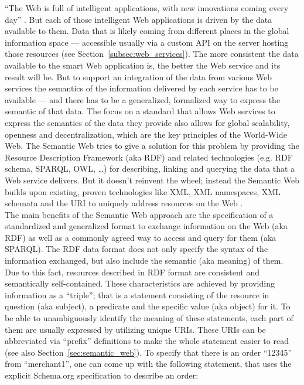 ``The Web is full of intelligent applications, with new innovations coming every day'' \citep{allemang2011semantic}. But each of those intelligent Web applications is driven by the data available to them. Data that is likely coming from different places in the global information space — accessible usually via a custom API on the server hosting those resources (see Section~\ref{subsec:web_services}). The more consistent the data available to the smart Web application is, the better the Web service and its result will be. But to support an integration of the data from various Web services the semantics of the information delivered by each service has to be available — and there has to be a generalized, formalized way to express the semantic of that data. The focus on a standard that allows Web services to express the semantics of the data they provide also allows for global scalability, openness and decentralization, which are the key principles of the World-Wide Web. The Semantic Web tries to give a solution for this problem by providing the Resource Description Framework (aka \gls{RDF}) and related technologies (e.g. RDF schema, \gls{SPARQL}, \gls{OWL}, \ldots) for describing, linking and querying the data that a Web service delivers. But it doesn’t reinvent the wheel; instead the Semantic Web builds upon existing, proven technologies like \gls{XML}, XML namespaces, XML schemata and the \gls{URI} to uniquely address resources on the Web \citep{allemang2011semantic}. \\

The main benefits of the Semantic Web approach are the specification of a standardized and generalized format to exchange information on the Web (aka \gls{RDF}) as well as a commonly agreed way to access and query for them (aka \gls{SPARQL}). The \gls{RDF} data format does not only specify the syntax of the information exchanged, but also include the semantic (aka meaning) of them. Due to this fact, resources described in \gls{RDF} format are consistent and semantically self-contained. These characteristics are achieved by providing information as a ``triple''; that is a statement consisting of the resource in question (aka subject), a predicate and the specific value (aka object) for it. To be able to unambiguously identify the meaning of these statements, each part of them are usually expressed by utilizing unique \gls{URI}s. These \gls{URI}s can be abbreviated via ``prefix'' definitions to make the whole statement easier to read (see also Section~\ref{sec:semantic_web}). To specify that there is an order ``12345'' from ``merchant1'', one can come up with the following statement, that uses the explicit Schema.org specification \citep{Schema.org} to describe an order: \@

